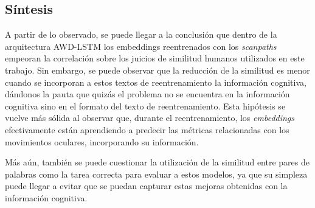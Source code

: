 \subsection{Síntesis}

A partir de lo observado, se puede llegar a la conclusión que dentro de la 
arquitectura AWD-LSTM los embeddings reentrenados con los \textit{scanpaths} 
empeoran la correlación sobre los juicios de similitud humanos utilizados 
en este trabajo. Sin embargo, se puede observar que la reducción de la similitud 
es menor cuando se incorporan a estos textos de reentrenamiento la información 
cognitiva, dándonos la pauta que quizás el problema no se encuentra en la 
información cognitiva sino en el formato del texto de reentrenamiento. 
Esta hipótesis se vuelve más sólida al observar que, durante el reentrenamiento, 
los \textit{embeddings} efectivamente están aprendiendo a predecir las métricas relacionadas 
con los movimientos oculares, incorporando su información.

Más aún, también se puede cuestionar la utilización de la similitud entre 
pares de palabras como la tarea correcta para evaluar a estos modelos, ya 
que su simpleza puede llegar a evitar que se puedan capturar estas 
mejoras obtenidas con la información cognitiva.





